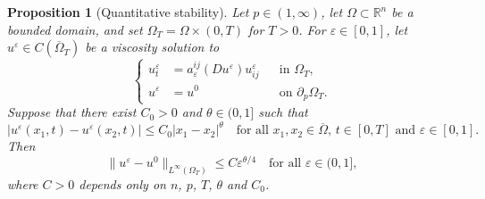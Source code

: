 \documentclass[a4paper,11pt]{amsart}
\theoremstyle{plain}
\newtheorem{proposition}[theorem]{Proposition}
\theoremstyle{definition}
\numberwithin{equation}{section}
\begin{document}
\begin{proposition}[Quantitative stability]\label{prop:quantitative-stability}
Let $p\in(1,\infty)$, let $\Omega\subset\mathbb R^n$ be a bounded domain, and set $\Omega_T=\Omega\times(0,T)$ for $T>0$. For $\varepsilon\in[0,1]$, let
$u^\varepsilon\in C(\overline{\Omega}_T)$ be a viscosity solution to
\begin{equation*}
\left\{
\begin{aligned}
u_t^\varepsilon&=a_\varepsilon^{ij}(Du^\varepsilon)u_{ij}^\varepsilon &&\text{in }\Omega_T,\\
u^\varepsilon&=u^0 &&\text{on }\partial_p\Omega_T.
\end{aligned}
\right.
\end{equation*}
 Suppose that there exist $C_0>0$ and $\theta\in(0,1]$ such that
\begin{equation*}
    |u^\varepsilon(x_1,t)-u^\varepsilon(x_2,t)| \leq C_0|x_1-x_2|^\theta \quad
    \text{for all $x_1,x_2\in\overline\Omega$, $t\in[0,T]$ and $\varepsilon\in[0,1]$.}
\end{equation*}
Then
\begin{equation*}
\|u^\varepsilon-u^0\|_{L^\infty(\Omega_T)} \leq C\varepsilon^{\theta/4} \quad\text{for all }\varepsilon\in(0,1],
\end{equation*}
where $C>0$ depends only on $n$, $p$, $T$, $\theta$ and $C_0$.
\end{proposition}
\end{document}
